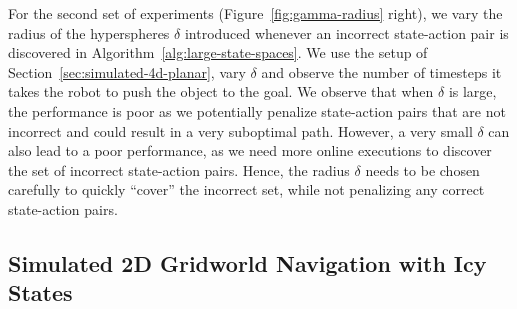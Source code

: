 For the second set of experiments (Figure~\ref{fig:gamma-radius}
right), we vary the radius of the 
hyperspheres $\delta$ introduced whenever an incorrect
state-action pair is discovered in
Algorithm~\ref{alg:large-state-spaces}. We use the setup of
Section~\ref{sec:simulated-4d-planar}, vary 
$\delta$ and observe the number of timesteps it takes the robot to
push the object to the goal. We observe that when $\delta$ is
large, the performance is poor as we potentially penalize state-action
pairs that are not incorrect and could result in a very suboptimal
path. However, a very small $\delta$ can also lead to a poor
performance, as we need more online executions to discover the set of
incorrect state-action pairs. Hence, the radius $\delta$ needs to be
chosen carefully to quickly ``cover'' the incorrect set, while not
penalizing any correct state-action pairs.

\subsection{Simulated 2D Gridworld Navigation with Icy States}
\label{sec:simul-2d-gridw}

